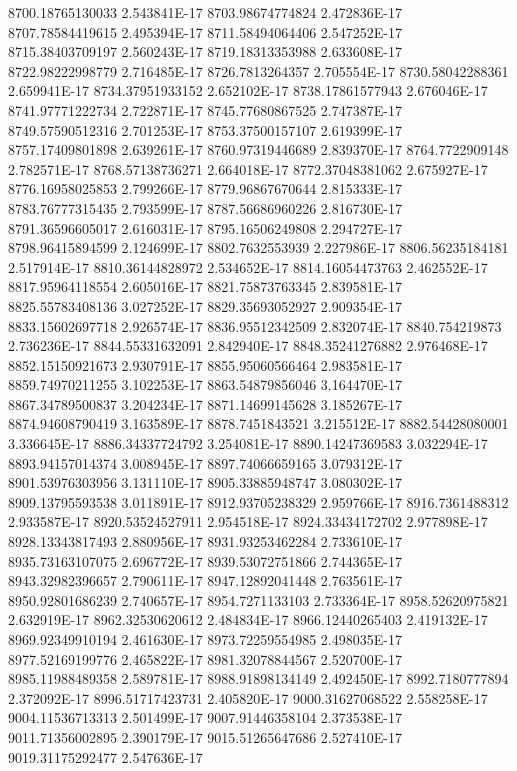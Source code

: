 8700.18765130033  2.543841E-17
8703.98674774824  2.472836E-17
8707.78584419615  2.495394E-17
8711.58494064406  2.547252E-17
8715.38403709197  2.560243E-17
8719.18313353988  2.633608E-17
8722.98222998779  2.716485E-17
8726.7813264357  2.705554E-17
8730.58042288361  2.659941E-17
8734.37951933152  2.652102E-17
8738.17861577943  2.676046E-17
8741.97771222734  2.722871E-17
8745.77680867525  2.747387E-17
8749.57590512316  2.701253E-17
8753.37500157107  2.619399E-17
8757.17409801898  2.639261E-17
8760.97319446689  2.839370E-17
8764.7722909148  2.782571E-17
8768.57138736271  2.664018E-17
8772.37048381062  2.675927E-17
8776.16958025853  2.799266E-17
8779.96867670644  2.815333E-17
8783.76777315435  2.793599E-17
8787.56686960226  2.816730E-17
8791.36596605017  2.616031E-17
8795.16506249808  2.294727E-17
8798.96415894599  2.124699E-17
8802.7632553939  2.227986E-17
8806.56235184181  2.517914E-17
8810.36144828972  2.534652E-17
8814.16054473763  2.462552E-17
8817.95964118554  2.605016E-17
8821.75873763345  2.839581E-17
8825.55783408136  3.027252E-17
8829.35693052927  2.909354E-17
8833.15602697718  2.926574E-17
8836.95512342509  2.832074E-17
8840.754219873  2.736236E-17
8844.55331632091  2.842940E-17
8848.35241276882  2.976468E-17
8852.15150921673  2.930791E-17
8855.95060566464  2.983581E-17
8859.74970211255  3.102253E-17
8863.54879856046  3.164470E-17
8867.34789500837  3.204234E-17
8871.14699145628  3.185267E-17
8874.94608790419  3.163589E-17
8878.7451843521  3.215512E-17
8882.54428080001  3.336645E-17
8886.34337724792  3.254081E-17
8890.14247369583  3.032294E-17
8893.94157014374  3.008945E-17
8897.74066659165  3.079312E-17
8901.53976303956  3.131110E-17
8905.33885948747  3.080302E-17
8909.13795593538  3.011891E-17
8912.93705238329  2.959766E-17
8916.7361488312  2.933587E-17
8920.53524527911  2.954518E-17
8924.33434172702  2.977898E-17
8928.13343817493  2.880956E-17
8931.93253462284  2.733610E-17
8935.73163107075  2.696772E-17
8939.53072751866  2.744365E-17
8943.32982396657  2.790611E-17
8947.12892041448  2.763561E-17
8950.92801686239  2.740657E-17
8954.7271133103  2.733364E-17
8958.52620975821  2.632919E-17
8962.32530620612  2.484834E-17
8966.12440265403  2.419132E-17
8969.92349910194  2.461630E-17
8973.72259554985  2.498035E-17
8977.52169199776  2.465822E-17
8981.32078844567  2.520700E-17
8985.11988489358  2.589781E-17
8988.91898134149  2.492450E-17
8992.7180777894  2.372092E-17
8996.51717423731  2.405820E-17
9000.31627068522  2.558258E-17
9004.11536713313  2.501499E-17
9007.91446358104  2.373538E-17
9011.71356002895  2.390179E-17
9015.51265647686  2.527410E-17
9019.31175292477  2.547636E-17

